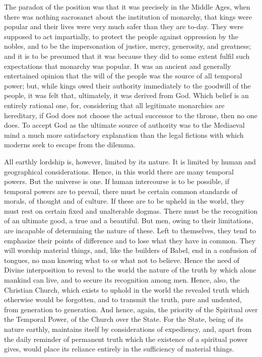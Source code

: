 \documentclass{book}
\begin{document}
The paradox of the position was that it was precisely in the Middle Ages, when there was nothing sacrosanct about the institution of monarchy, that kings were popular and their lives were very much safer than they are to-day. They were supposed to act impartially, to protect the people against oppression by the nobles, and to be the impersonation of justice, mercy, generosity, and greatness; and it is to be presumed that it was because they did to some extent fulfil such expectations that monarchy was popular. It was an ancient and generally entertained opinion that the will of the people was the source of all temporal power; but, while kings owed their authority immediately to the goodwill of the people, it was felt that, ultimately, it was derived from God. Which belief is an entirely rational one, for, considering that all legitimate monarchies are hereditary, if God does not choose the actual successor to the throne, then no one does. To accept God as the ultimate source of authority was to the Mediaeval mind a much more satisfactory explanation than the legal fictions with which moderns seek to escape from the dilemma.

All earthly lordship is, however, limited by its nature. It is limited by human and geographical considerations. Hence, in this world there are many temporal powers. But the universe is one. If human intercourse is to be possible, if temporal powers are to prevail, there must be certain common standards of morals, of thought and of culture. If these are to be upheld in the world, they must rest on certain fixed and unalterable dogmas. There must be the recognition of an ultimate good, a true and a beautiful. But men, owing to their limitations, are incapable of determining the nature of these. Left to themselves, they tend to emphasize their points of difference and to lose what they have in common. They will worship material things, and, like the builders of Babel, end in a confusion of tongues, no man knowing what to or what not to believe. Hence the need of Divine interposition to reveal to the world the nature of the truth by which alone mankind can live, and to secure its recognition among men. Hence, also, the Christian Church, which exists to uphold in the world the revealed truth which otherwise would be forgotten, and to transmit the truth, pure and undented, from generation to generation. And hence, again, the priority of the Spiritual over the Temporal Power, of the Church over the State. For the State, being of its nature earthly, maintains itself by considerations of expediency, and, apart from the daily reminder of permanent truth which the existence of a spiritual power gives, would place its reliance entirely in the sufficiency of material things.
\end{document}
